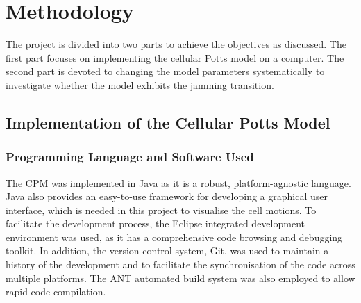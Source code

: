\documentclass[a4paper,12pt]{article}
\begin{document}
\section{Methodology}
The project is divided into two parts to achieve the objectives as discussed. The first part focuses on implementing the cellular Potts model on a computer. The second part is devoted to changing the model parameters systematically to investigate whether the model exhibits the jamming transition.

\subsection{Implementation of the Cellular Potts Model}
\subsubsection{Programming Language and Software Used}
The CPM was implemented in Java as it is a robust, platform-agnostic language. Java also provides an easy-to-use framework for developing a graphical user interface, which is needed in this project to visualise the cell motions. To facilitate the development process, the Eclipse integrated development environment was used, as it has a comprehensive code browsing and debugging toolkit. In addition, the version control system, Git, was used to maintain a history of the development and to facilitate the synchronisation of the code across multiple platforms. The ANT automated build system was also employed to allow rapid code compilation.
\end{document}
